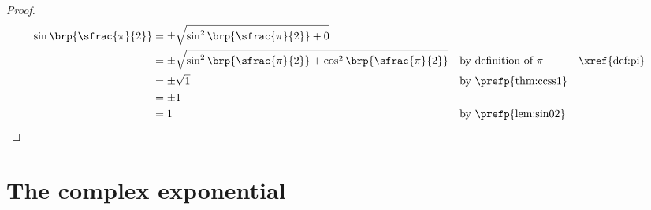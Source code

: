 \begin{proposition}
\label{prop:sinpi2}
\end{proposition}
\begin{proof}
\begin{align*}
  \sin\brp{\sfrac{\pi}{2}}
    &= \pm\sqrt{\sin^2\brp{\sfrac{\pi}{2}} + 0}
  \\&= \pm\sqrt{\sin^2\brp{\sfrac{\pi}{2}} + \cos^2\brp{\sfrac{\pi}{2}}}
    && \text{by definition of $\pi$}&&\text{\xref{def:pi}}
  \\&= \pm\sqrt{1}
    && \text{by \prefp{thm:ccss1}}
  \\&= \pm1
  \\&= 1
    && \text{by \prefp{lem:sin02}}
\end{align*}
\end{proof}

\section{The complex exponential}

